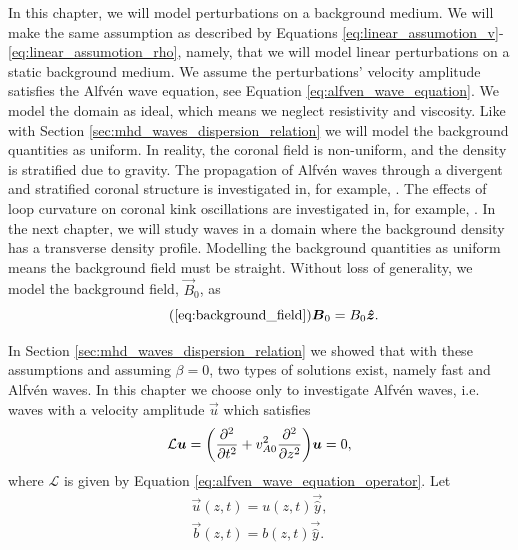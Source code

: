 In this chapter, we will model perturbations on a background medium. We will make the same assumption as described by Equations \eqref{eq:linear_assumotion_v}-\eqref{eq:linear_assumotion_rho}, namely, that we will model linear perturbations on a static background medium. We assume the perturbations' velocity amplitude satisfies the Alfv\'en wave equation, see Equation \eqref{eq:alfven_wave_equation}. We model the domain as ideal, which means we neglect resistivity and viscosity. Like with Section \ref{sec:mhd_waves_dispersion_relation} we will model the background quantities as uniform. In reality, the coronal field is non-uniform, and the density is stratified due to gravity. The propagation of Alfv\'en waves through a divergent and stratified coronal structure is investigated in, for example, \citet{Smith2007}. The effects of loop curvature on coronal kink oscillations are investigated in, for example, \citet{vanDoorsselaere2009}. In the next chapter, we will study waves in a domain where the background density has a transverse density profile. Modelling the background quantities as uniform means the background field must be straight. Without loss of generality, we model the background field, $\vec{B}_0$, as
\begin{equation}
    \tag{\ref{eq:background_field}}
    \vec{B}_0 = B_0\vec{\hat{z}}.
\end{equation}

In Section \ref{sec:mhd_waves_dispersion_relation} we showed that with these assumptions and assuming $\beta=0$, two types of solutions exist, namely fast and Alfv\'en waves. In this chapter we choose only to investigate Alfv\'en waves, i.e. waves with a velocity amplitude $\vec{u}$ which satisfies
\begin{equation}
    \label{eq:alfven_wave_equation2}
    \mathcal{L}\boldsymbol{u}=\qty(\pdv[2]{}{t}+v_{A0}^2\pdv[2]{}{z})\boldsymbol{u}=0,
\end{equation}
where $\mathcal{L}$ is given by Equation \eqref{eq:alfven_wave_equation_operator}.
Let
\begin{gather}
    \label{eq:y_component_of_u}
     \vec{u}(z,t) = u(z,t)\vec{\hat{y}}, \\
     \label{eq:y_component_of_b}
     \vec{b}(z,t) = b(z,t)\vec{\hat{y}}.
\end{gather}

